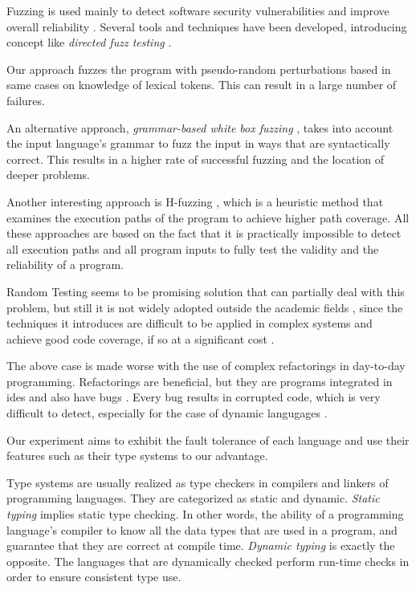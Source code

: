 \documentclass[10pt]{sigplanconf}
\begin{document}
Fuzzing is used mainly to detect software security vulnerabilities and 
improve overall reliability \cite{TJC08,GODE07}. Several tools and techniques \cite{WWGZ11}
have been developed, introducing concept like \textit{directed fuzz testing} \cite{GLRI09}.

Our approach fuzzes the program with pseudo-random
perturbations based in same cases on knowledge of
lexical tokens. This can result in a large number of failures.

An alternative approach, {\em grammar-based white box fuzzing} \cite{God08},
takes into account the input language's grammar to fuzz the input in
ways that are syntactically correct.
This results in a higher rate of successful fuzzing and the location
of deeper problems.

Another interesting approach is H-fuzzing \cite{ZWZH11}, which is a heuristic method that examines the execution paths
of the program to achieve higher path coverage. All these approaches are based on the fact that it is practically impossible to detect all
execution paths and all program inputs to fully test the validity and the reliability of a program.

Random Testing \cite{HAM06} seems to be promising solution that can partially deal with this problem,
but still it is not widely adopted outside the academic fields \cite{GGBO07}, since the techniques it 
introduces are difficult to be applied in complex systems and achieve good code coverage, if so at a significant cost \cite{RAWO06}.

The above case is made worse with the use of complex refactorings \cite{Fow00} in day-to-day programming. Refactorings are beneficial, but they are programs integrated in {\sc ide}s and also have bugs \cite{DDGM07}. Every bug results in corrupted code, which is very difficult to detect, especially for the case of dynamic langugages \cite{SCHA12,FFM11}.

Our experiment aims to exhibit the fault tolerance \cite{LYU95,KOKR07} of each language and use their features such as 
their type systems to our advantage. 

Type systems are usually realized as type checkers in compilers and linkers of programming languages. They are categorized as static and dynamic. \textit{Static typing} implies static type checking. In other words, the ability of a programming language's compiler to know all the data types that are used in a program, and guarantee that they are correct at compile time. \textit{Dynamic typing} is exactly the opposite. The languages that are dynamically checked perform run-time checks in order to ensure consistent type use. 
\end{document}
